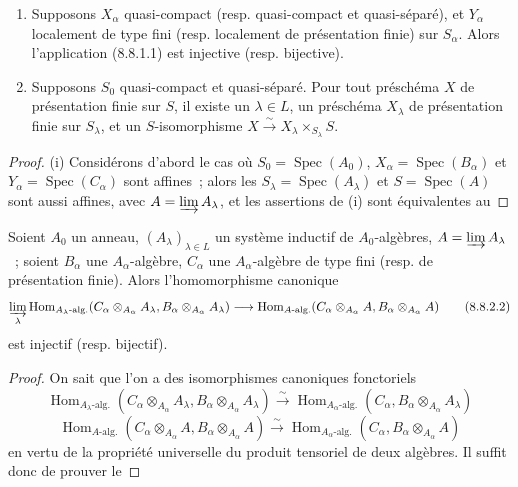 \begin{theorem}[8.8.2]
\begin{enumerate}
\item[\textup{(i)}] Supposons $X_\alpha$ quasi-compact \textup{(resp.} quasi-compact et
quasi-séparé\textup{)}, et $Y_\alpha$ localement de type fini \textup{(resp.} localement de
présentation finie\textup{)} sur $S_\alpha$. Alors l'application \textup{(8.8.1.1)} est
injective \textup{(resp.} bijective\textup{)}.
\item[\textup{(ii)}] Supposons $S_0$ quasi-compact et quasi-séparé. Pour tout préschéma
$X$ de présentation finie sur $S$, il existe un $\lambda\in L$, un préschéma
$X_\lambda$ de présentation finie sur $S_\lambda$, et un $S$-isomorphisme
$X\xrightarrow{\sim}X_\lambda\times_{S_\lambda}S$.
\end{enumerate}
\end{theorem}

\begin{proof}
(i) Considérons d'abord le cas où $S_0=\operatorname{Spec}(A_0)$,
$X_\alpha=\operatorname{Spec}(B_\alpha)$ et
$Y_\alpha=\operatorname{Spec}(C_\alpha)$ sont affines~; alors les
$S_\lambda=\operatorname{Spec}(A_\lambda)$ et $S=\operatorname{Spec}(A)$ sont
aussi affines, avec $A=\varinjlim A_\lambda$, et les assertions de (i) sont
équivalentes au
\end{proof}

\begin{lemma}[8.8.2.1]
\label{IV.8.8.2.1-fr}
Soient $A_0$ un anneau, $(A_\lambda)_{\lambda\in L}$ un système inductif de
$A_0$-algèbres, $A=\varinjlim A_\lambda$~; soient $B_\alpha$ une
$A_\alpha$-algèbre, $C_\alpha$ une $A_\alpha$-algèbre de type fini \textup{(resp.} de
présentation finie\textup{)}. Alors l'homomorphisme canonique
\begin{equation}
\varinjlim_\lambda
\operatorname{Hom}_{A_\lambda\textup{-alg.}}
  (C_\alpha\otimes_{A_\alpha}A_\lambda,
   B_\alpha\otimes_{A_\alpha}A_\lambda)
\longrightarrow
\operatorname{Hom}_{A\textup{-alg.}}
  (C_\alpha\otimes_{A_\alpha}A,
   B_\alpha\otimes_{A_\alpha}A)
\tag{8.8.2.2}\label{IV.8.8.2.2-fr}
\end{equation}
est injectif \textup{(resp.} bijectif\textup{)}.
\end{lemma}

\begin{proof}
On sait que l'on a des isomorphismes canoniques fonctoriels
\[
\operatorname{Hom}_{A_\lambda\text{-alg.}}
 (C_\alpha\otimes_{A_\alpha}A_\lambda,
  B_\alpha\otimes_{A_\alpha}A_\lambda)
\xrightarrow{\sim}
\operatorname{Hom}_{A_\alpha\text{-alg.}}
 (C_\alpha,B_\alpha\otimes_{A_\alpha}A_\lambda)
\]
\[
\operatorname{Hom}_{A\text{-alg.}}
 (C_\alpha\otimes_{A_\alpha}A,
  B_\alpha\otimes_{A_\alpha}A)
\xrightarrow{\sim}
\operatorname{Hom}_{A_\alpha\text{-alg.}}
 (C_\alpha,B_\alpha\otimes_{A_\alpha}A)
\]
en vertu de la propriété universelle du produit tensoriel de deux algèbres. Il
suffit donc de prouver le
\end{proof}

